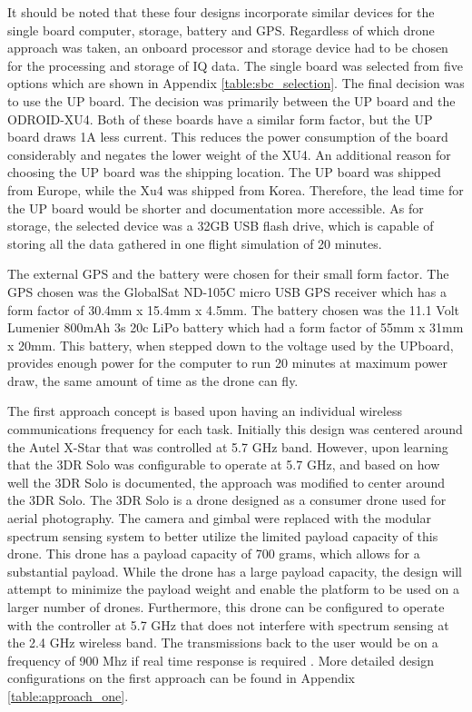 It should be noted that these four designs incorporate similar devices for the single board computer, storage, battery and GPS. Regardless of which drone approach was taken, an onboard processor and storage device had to be chosen for the processing and storage of IQ data. The single board was selected from five options which are shown in Appendix \ref{table:sbc_selection}. The final decision was to use the UP board. The decision was primarily between the UP board and the ODROID-XU4. Both of these boards have a similar form factor, but the UP board draws 1A less current. This reduces the power consumption of the board considerably and negates the lower weight of the XU4. An additional reason for choosing the UP board was the shipping location. The UP board was shipped from Europe, while the Xu4 was shipped from Korea. Therefore, the lead time for the UP board would be shorter and documentation more accessible. As for storage, the selected device was a 32GB USB flash drive, which is capable of storing all the data gathered in one flight simulation of 20 minutes. \par

The external GPS and the battery were chosen for their small form factor. The GPS chosen was the GlobalSat ND-105C micro USB GPS receiver which has a form factor of 30.4mm x 15.4mm x 4.5mm. The battery chosen was the 11.1 Volt Lumenier 800mAh 3s 20c LiPo battery which had a form factor of 55mm x 31mm x 20mm. This battery, when stepped down to the voltage used by the UPboard, provides enough power for the computer to run 20 minutes at maximum power draw, the same amount of time as the drone can fly. \par

The first approach concept is based upon having an individual wireless communications frequency for each task. Initially this design was centered around the Autel X-Star that was controlled at 5.7 GHz band. However, upon learning that the 3DR Solo was configurable to operate at 5.7 GHz, and based on how well the 3DR Solo is documented, the approach was modified to center around the 3DR Solo. The 3DR Solo is a drone designed as a consumer drone used for aerial photography. The camera and gimbal were replaced with the modular spectrum sensing system to better utilize the limited payload capacity of this drone. This drone has a payload capacity of 700 grams, which allows for a substantial payload. While the drone has a large payload capacity, the design will attempt to minimize the payload weight and enable the platform to be used on a larger number of drones. Furthermore, this drone can be configured to operate with the controller at 5.7 GHz that does not interfere with spectrum sensing at the 2.4 GHz wireless band. The transmissions back to the user would be on a frequency of 900 Mhz if real time response is required \cite{3dr_Website}. More detailed design configurations on the first approach can be found in Appendix \ref{table:approach_one}. \par

